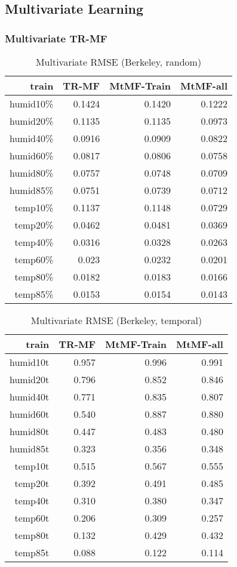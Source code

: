 \subsection{Multivariate Learning}
\subsubsection{Multivariate TR-MF}

\begin{table}[htbp]
\setlength{\tabcolsep}{2pt}
\centering
\caption{Multivariate RMSE (Berkeley, random)}
\label{table:multi_berkeley_random}
\begin{tabular}{r | r r r}
train	&TR-MF	&MtMF-Train	&MtMF-all \\ \hline
humid10\%	&0.1424	&0.1420	&0.1222\\
humid20\%	&0.1135	&0.1135	&0.0973\\
humid40\%	&0.0916	&0.0909	&0.0822\\
humid60\%	&0.0817	&0.0806	&0.0758\\
humid80\%	&0.0757	&0.0748	&0.0709\\
humid85\%	&0.0751	&0.0739	&0.0712\\ \hline
 temp10\%	&0.1137	&0.1148	&0.0729\\
 temp20\%	&0.0462	&0.0481	&0.0369\\
 temp40\%	&0.0316	&0.0328	&0.0263\\
 temp60\%	&0.023	&0.0232	&0.0201\\
 temp80\%	&0.0182	&0.0183	&0.0166\\
 temp85\%	&0.0153	&0.0154	&0.0143\\
\end{tabular}
\end{table}

\begin{table}[htbp]
\setlength{\tabcolsep}{2pt}
\centering
\caption{Multivariate RMSE (Berkeley, temporal)}
\label{table:multi_berkeley_temporal}
\begin{tabular}{r | r r r}
train	&TR-MF	&MtMF-Train	&MtMF-all \\ \hline
humid10t	&0.957&0.996& 	0.991\\
humid20t	&0.796&0.852& 	0.846\\
humid40t	&0.771&0.835& 	0.807\\
humid60t	&0.540&0.887& 	0.880\\
humid80t	&0.447&0.483& 	0.480\\
humid85t	&0.323&0.356& 	0.348\\	\hline
 temp10t	&0.515&0.567& 	0.555\\
 temp20t	&0.392&0.491& 	0.485\\
 temp40t	&0.310&0.380& 	0.347\\
 temp60t	&0.206&0.309& 	0.257\\
 temp80t	&0.132&0.429& 	0.432\\
 temp85t	&0.088&0.122& 	0.114\\
\end{tabular}
\end{table}

